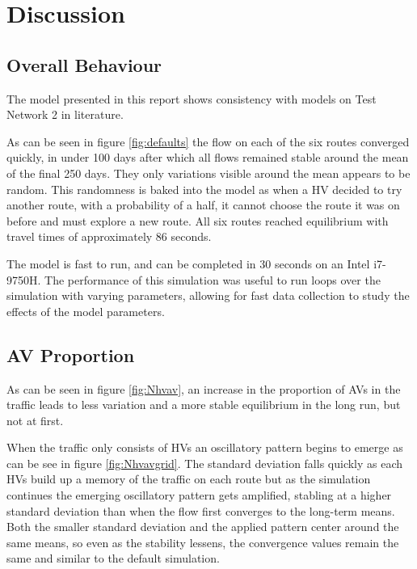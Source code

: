 \documentclass[12pt, a4paper, onecolumn]{article}
\begin{document}
\pagebreak

\section{Discussion}

\subsection{Overall Behaviour}
The model presented in this report shows consistency with models on Test Network 2 in literature.

As can be seen in figure \ref{fig:defaults} the flow on each of the six routes converged quickly, in under 100 days after which all flows remained stable around the mean of the final 250 days. They only variations visible around the mean appears to be random. This randomness is baked into the model as when a HV decided to try another route, with a probability of a half, it cannot choose the route it was on before and must explore a new route. All six routes reached equilibrium with travel times of approximately 86 seconds. 

The model is fast to run, and can be completed in 30 seconds on an Intel i7-9750H. The performance of this simulation was useful to run loops over the simulation with varying parameters, allowing for fast data collection to study the effects of the model parameters.

\subsection{AV Proportion}
As can be seen in figure \ref{fig:Nhvav}, an increase in the proportion of AVs in the traffic leads to less variation and a more stable equilibrium in the long run, but not at first.

When the traffic only consists of HVs an oscillatory pattern begins to emerge as can be see in figure \ref{fig:Nhvavgrid}. The standard deviation falls quickly as each HVs build up a memory of the traffic on each route but as the simulation continues the emerging oscillatory pattern gets amplified, stabling at a higher standard deviation than when the flow first converges to the long-term means. Both the smaller standard deviation and the applied pattern center around the same means, so even as the stability lessens, the convergence values remain the same and similar to the default simulation.
\end{document}
